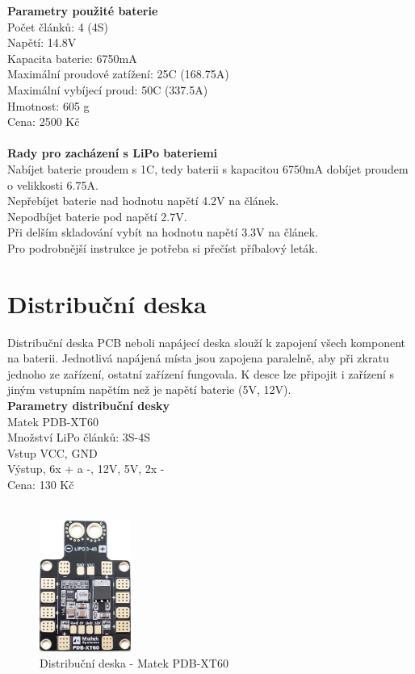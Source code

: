 \textbf{Parametry použité baterie}\\
Počet článků: 4 (4S)\\
Napětí: 14.8V\\
Kapacita baterie: 6750mA\\
Maximální proudové zatížení: 25C (168.75A)\\
Maximální vybíjecí proud: 50C (337.5A)\\
Hmotnost: 605 g\\
Cena: 2500 Kč\\
\cite{baterie}\\

\textbf{Rady pro zacházení s LiPo bateriemi}\\
Nabíjet baterie proudem s 1C, tedy baterii s kapacitou 6750mA dobíjet proudem o velikkosti 6.75A.\\
Nepřebíjet baterie nad hodnotu napětí 4.2V na článek.\\
Nepodbíjet baterie pod napětí 2.7V.\\
Při delším skladování vybít na hodnotu napětí 3.3V na článek.\\
Pro podrobnější instrukce je potřeba si přečíst příbalový leták.\\

\section{Distribuční deska} 
Distribuční deska PCB neboli napájecí deska slouží k zapojení všech  komponent na baterii. Jednotlivá napájená místa jsou zapojena paralelně, aby při zkratu jednoho ze zařízení, ostatní zařízení fungovala. K desce lze připojit i zařízení s jiným vstupním napětím než je napětí baterie (5V, 12V).\\

\textbf{Parametry distribuční desky}\\
Matek PDB-XT60\\
Množství LiPo článků: 3S-4S\\
Vstup VCC, GND\\
Výstup, 6x + a -, 12V, 5V, 2x -\\
Cena: 130 Kč\\
\cite{pdb}\\

\begin{figure}[H]
	\centering
	\includegraphics[width=3cm]{pictures/pdb.jpg}
	\caption{Distribuční deska - Matek PDB-XT60}
\end{figure}

